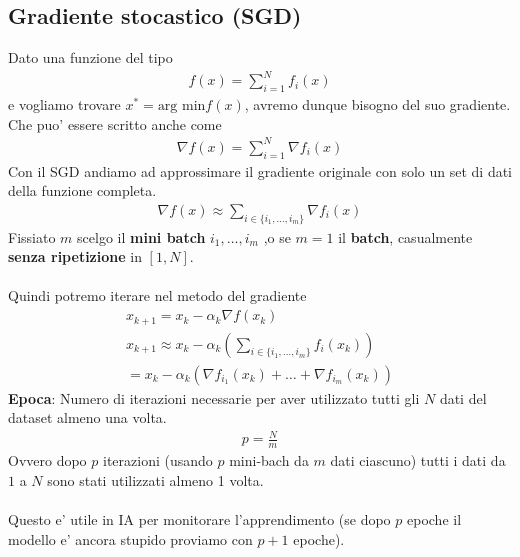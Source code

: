 \documentclass[a4paper,12pt]{article}
\begin{document}
\subsection{Gradiente stocastico (SGD)}
Dato una funzione del tipo
\begin{align*}
    f(x) = \sum_{i=1}^N f_i(x)
\end{align*}
e vogliamo trovare $x^* = \text{arg min}f(x)$, avremo dunque bisogno del suo gradiente. Che puo' essere scritto anche come
\begin{align*}
    \nabla f(x) = \sum_{i=1}^N \nabla f_i(x)
\end{align*}
Con il SGD andiamo ad approssimare il gradiente originale con solo un set di dati della funzione completa.
\begin{align*}
    \nabla f(x) \approx \sum_{i \in \{i_1, \dots, i_m\}} \nabla f_i(x)
\end{align*}
Fissiato $m$ scelgo il \textbf{mini batch} $i_1,\dots,i_m$ ,o se $m=1$ il \textbf{batch}, casualmente \textbf{senza ripetizione} in $[1,N]$. \\
\vspace{2em}\\
Quindi potremo iterare nel metodo del gradiente
\begin{align*}
    x_{k+1} = x_k - \alpha_k \nabla f(x_k) \\
    \boxed{x_{k+1} \approx x_k - \alpha_k (\sum_{i \in \{i_1, \dots, i_m\}}f_i(x_k))}\\    
    = x_k - \alpha_k (\nabla f_{i_1}(x_k) + \dots + \nabla f_{i_m}(x_k))
\end{align*}
\textbf{Epoca}: Numero di iterazioni necessarie per aver utilizzato tutti gli $N$ dati del dataset almeno una volta.
\begin{align*}
    p = \frac{N}{m}
\end{align*}
Ovvero dopo $p$ iterazioni (usando $p$ mini-bach da $m$ dati ciascuno) tutti i dati da $1$ a $N$ sono stati utilizzati almeno 1 volta. \\
\vspace{1em}\\
Questo e' utile in IA per monitorare l'apprendimento (se dopo $p$ epoche il modello e' ancora stupido proviamo con $p+1$ epoche).
\pagebreak
\end{document}
